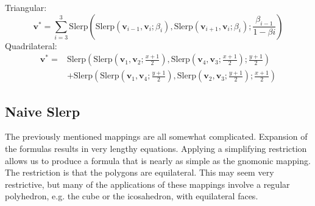 \documentclass{amsart}[12pt]
\begin{document}
Triangular:
\begin{equation}\label{eq:nst}
\mathbf v^* = \sum^3_{i=3} \mathrm{Slerp}(
\mathrm{Slerp}(\mathbf v_{i-1}, \mathbf v_i; \beta_{i}),
\mathrm{Slerp}(\mathbf v_{i+1}, \mathbf v_i; \beta_{i});
\frac{\beta_{i-1}}{1-\beta{i}})
\end{equation}
Quadrilateral:%
\begin{equation}\label{eq:nsq}
  \begin{split}
\mathbf v^* =& \mathrm{Slerp}(
\mathrm{Slerp}(\mathbf v_1, \mathbf v_2; \frac{x+1}{2}),
\mathrm{Slerp}(\mathbf v_4, \mathbf v_3; \frac{x+1}{2}); \frac{y+1}{2})\\
&+ \mathrm{Slerp}(
\mathrm{Slerp}(\mathbf v_1, \mathbf v_4; \frac{y+1}{2}),
\mathrm{Slerp}(\mathbf v_2, \mathbf v_3; \frac{y+1}{2}); \frac{x+1}{2})
\end{split}
\end{equation}

\subsection{Naive Slerp}
The previously mentioned mappings are all somewhat complicated. Expansion of the
formulas results in very lengthy equations. Applying a simplifying restriction
allows us to produce a formula that is nearly as simple as the gnomonic mapping.
The restriction is that the polygons are equilateral. This may seem very
restrictive, but many of the applications of these mappings involve a regular
polyhedron, e.g. the cube or the icosahedron, with equilateral faces.
\end{document}
